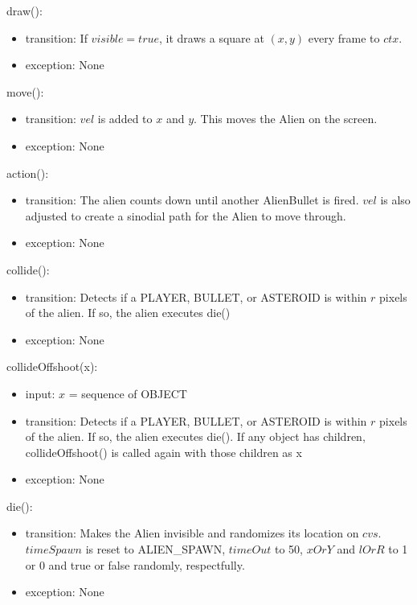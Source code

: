\documentclass[12pt]{article}
\begin{document}
\noindent draw():
\begin{itemize}
  \item transition: If $visible = true$, it draws a square at $(x,y)$ every frame to $ctx$.
  \item exception: None
\end{itemize}

\noindent move():
\begin{itemize}
  \item transition: $vel$ is added to $x$ and $y$. This moves the Alien on the screen.
  \item exception: None
\end{itemize}

\noindent action():
\begin{itemize}
  \item transition: The alien counts down until another AlienBullet is fired. $vel$ is also adjusted to create a sinodial path for the Alien to move through.
  \item exception: None
\end{itemize}

\noindent collide():
\begin{itemize}
  \item transition: Detects if a PLAYER, BULLET, or ASTEROID is within $r$ pixels of the alien. If so, the alien executes die()
  \item exception: None
\end{itemize}

\noindent collideOffshoot(x):
\begin{itemize}
  \item input: $x$ = sequence of OBJECT
  \item transition: Detects if a PLAYER, BULLET, or ASTEROID is within $r$ pixels of the alien. If so, the alien executes die(). If any object has children, collideOffshoot() is called again with those children as x
  \item exception: None
\end{itemize}

\noindent die():
\begin{itemize}
  \item transition: Makes the Alien invisible and randomizes its location on $cvs$. $timeSpawn$ is reset to ALIEN\_SPAWN, $timeOut$ to 50, $xOrY$ and $lOrR$ to 1 or 0 and true or false randomly, respectfully.
  \item exception: None
\end{itemize}
\end{document}
